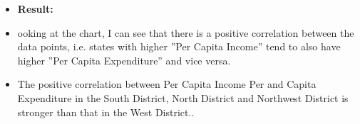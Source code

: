 \documentclass[12pt,letterpaper]{article}
\begin{document}
\begin{itemize}
\begin{itemize}
	\item\textbf{ Result:}
	\item ooking at the chart, I can see that there is a positive correlation between the data points, i.e. states with higher ''Per Capita Income'' tend to also have higher ''Per Capita Expenditure'' and vice versa.
	\item The positive correlation between Per Capita Income Per and Capita Expenditure in the South District, North District and Northwest District is stronger than that in the West District..
\end{itemize}
\end{itemize}
\end{document}
